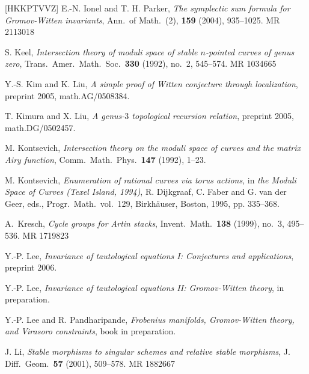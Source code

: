 \documentclass[12pt,letterpaper]{amsart}
\newcommand{\cited}{}
\newcommand{\lremind}[1]{{\bf[label:  #1]}}
\renewcommand{\lremind}[1]{{}}
\begin{document}
\begin{thebibliography}{[HKKPTVVZ]}
  E.-N. Ionel and T. H. Parker, {\em The symplectic
sum formula for Gromov-Witten invariants}, Ann.\ of Math.\ (2), {\bf 159} (2004),
935--1025.  MR 2113018 \cited


 S. Keel, {\em Intersection theory of moduli space
of stable $n$-pointed curves of genus zero}, Trans.\ Amer.\  Math.\ Soc.\
{\bf 330} (1992), no.\ 2, 545--574. MR 1034665 \cited \lremind{keel}   

 Y.-S. Kim and K. Liu, {\em A simple proof of Witten
conjecture through localization}, preprint 2005, math.AG/0508384. 
\cited

 T. Kimura and X. Liu, {\em A genus-$3$ topological
recursion relation}, preprint 2005, math.DG/0502457. \cited

M. Kontsevich, {\em Intersection theory on 
the moduli space of curves and the matrix Airy function}, Comm.\ Math.\ Phys.\ 
  {\bf 147} (1992), 1--23. \cited

M. Kontsevich, {\em Enumeration of rational curves via torus actions},
in {\em the Moduli Space of Curves (Texel Island, 1994)},
R. Dijkgraaf, C. Faber and G. van der Geer, eds., Progr.\ Math.\ vol.\ 129,
Birkh\"auser, Boston, 1995, pp. 335--368. \cited

 A.\ Kresch, {\em Cycle groups for Artin stacks},
Invent.\ Math.\ {\bf 138} (1999), no.\ 3, 495--536. MR 1719823 \cited

\bibitem[Lee1]{yplee} Y.-P. Lee, {\em Invariance of tautological
equations I:  Conjectures and applications}, preprint 2006.\cited

\bibitem[Lee2]{lee2} Y.-P. Lee, {\em Invariance of tautological
equations II:  Gromov-Witten theory}, in preparation.


 Y.-P. Lee and R. Pandharipande, {\em Frobenius manifolds, 
Gromov-Witten theory, and Virasoro constraints}, book in preparation.
\cited 

 J. Li, {\em Stable morphisms to singular schemes and
relative stable morphisms}, J. Diff.\ Geom.\ {\bf 57} (2001), 509--578.
MR 1882667
\cited


\end{thebibliography}
\end{document}
